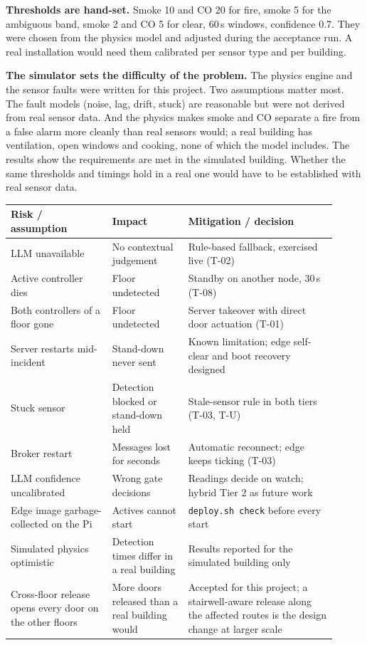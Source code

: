 \documentclass[11pt]{article}
\begin{document}
\textbf{Thresholds are hand-set.} Smoke 10 and CO 20 for fire, smoke 5 for the ambiguous band, 
smoke 2 and CO 5 for clear, 60\,s windows, confidence 0.7. They were chosen from the physics 
model and adjusted during the acceptance run. A real installation would need them calibrated 
per sensor type and per building.

\textbf{The simulator sets the difficulty of the problem.} The physics engine and the sensor 
faults were written for this project. Two assumptions matter most. The fault models (noise, lag, drift, stuck) 
are reasonable but were not derived from real sensor data. And the physics makes smoke and CO separate 
a fire from a false alarm more cleanly than real sensors would; a real building has ventilation, open 
windows and cooking, none of which the model includes. The results show the requirements are 
met in the simulated building. Whether the same thresholds and timings hold in a real one 
would have to be established with real sensor data.

\begin{longtable}[]{@{}
  >{\raggedright\arraybackslash}p{0.29\linewidth}
  >{\raggedright\arraybackslash}p{0.21\linewidth}
  >{\raggedright\arraybackslash}p{0.41\linewidth}@{}}
\toprule
\textbf{Risk / assumption} & \textbf{Impact} & \textbf{Mitigation / decision} \\
\midrule
\endhead
LLM unavailable & No contextual judgement & Rule-based fallback, exercised live (T-02) \\
Active controller dies & Floor undetected & Standby on another node, 30\,s (T-08) \\
Both controllers of a floor gone & Floor undetected & Server takeover with direct door actuation (T-01) \\
Server restarts mid-incident & Stand-down never sent & Known limitation; edge self-clear and boot recovery designed \\
Stuck sensor & Detection blocked or stand-down held & Stale-sensor rule in both tiers (T-03, T-U) \\
Broker restart & Messages lost for seconds & Automatic reconnect; edge keeps ticking (T-03) \\
LLM confidence uncalibrated & Wrong gate decisions & Readings decide on watch; hybrid Tier 2 as future work \\
Edge image garbage-collected on the Pi & Actives cannot start & \texttt{deploy.sh check} before every start \\
Simulated physics optimistic & Detection times differ in a real building & Results reported for the simulated building only \\
Cross-floor release opens every door on the other floors & More doors released than a real building 
would & Accepted for this project; a stairwell-aware release along the affected routes is the design 
change at larger scale \\
\bottomrule
\end{longtable}
\end{document}
